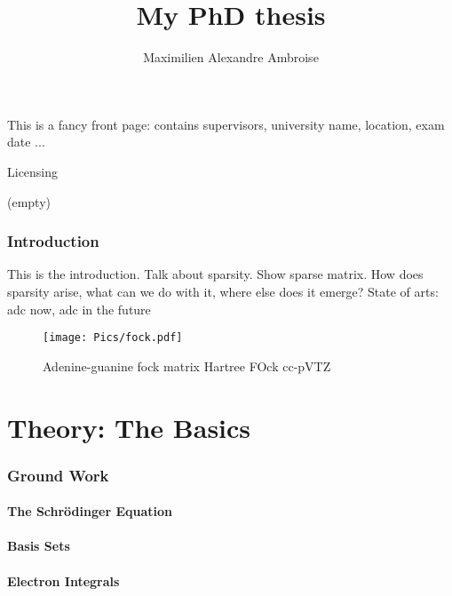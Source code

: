 \documentclass{article}
\begin{document}
\author{Maximilien Alexandre Ambroise}
\title{My PhD thesis}

\maketitle

This is a fancy front page: contains supervisors, university name, location, exam date ...

\newpage

Licensing

\newpage

(empty)

\newpage

\tableofcontents

\newpage

\section{Introduction}

This is the introduction. Talk about sparsity. Show sparse matrix. How does sparsity arise, what can we do with it, where else does it emerge?
State of arts: adc now, adc in the future

\begin{figure}
\centering
\texttt{[image: Pics/fock.pdf]}
\caption{Adenine-guanine fock matrix Hartree FOck cc-pVTZ}
\label{SparseExample}
\end{figure}

\newpage

\part{Theory: The Basics}

\section{Ground Work}

\subsection{The Schrödinger Equation}

\subsection{Basis Sets}

\subsection{Electron Integrals}
\end{document}
